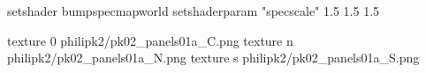 setshader bumpspecmapworld
setshaderparam "specscale" 1.5 1.5 1.5

texture 0 philipk2/pk02_panels01a_C.png
texture n philipk2/pk02_panels01a_N.png
texture s philipk2/pk02_panels01a_S.png

